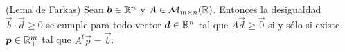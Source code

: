 %	
%	

%	


% 

\begin{lema}{\rm (Lema de Farkas)}\label{lema-farkas}
Sean $\boldsymbol{b}\in \mathbb{R}^n$ y $A \in \mathcal{M}_{m\times n}(\mathbb{R})$. Entonces la desigualdad $\vec{b}\cdot \vec{d} \geq 0$ se cumple para todo vector $\boldsymbol{d}\in \mathbb{R}^n$ tal que $A\vec{d} \geq \vec{0}$ si y s\'olo si existe $\boldsymbol{p}\in \mathbb{R}^m_+$ tal que $A^t \vec{p} = \vec{b}$. 
\end{lema}

